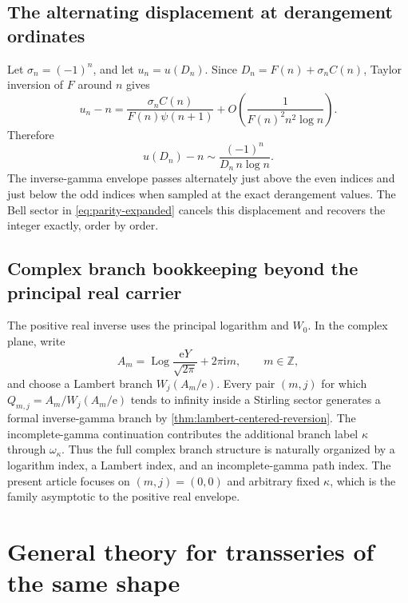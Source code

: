 \documentclass[11pt]{article}
\numberwithin{equation}{section}
\theoremstyle{mainthm}
\theoremstyle{defstyle}
\theoremstyle{remark}
\newcommand{\e}{\mathrm e}
\newcommand{\ii}{\mathrm i}
\newcommand{\Log}{\operatorname{Log}}
\begin{document}
\subsection{The alternating displacement at derangement ordinates}

Let \(\sigma_n=(-1)^n\), and let \(u_n=u(D_n)\).  Since
\(
 D_n=F(n)+\sigma_nC(n)
\), Taylor inversion of \(F\) around \(n\) gives
\begin{equation}\label{eq:u-n-exact-leading}
 u_n-n
 =\frac{\sigma_n C(n)}{F(n)\psi(n+1)}
 +O\!\left(\frac{1}{F(n)^2n^2\log n}\right).
\end{equation}
Therefore
\begin{equation}\label{eq:u-n-simple-asymptotic}
 \boxed{
 u(D_n)-n
 \sim\frac{(-1)^n}{D_n\,n\log n}.}
\end{equation}
The inverse-gamma envelope passes alternately just above the even indices and just below the odd indices when sampled at the exact derangement values.  The Bell sector in \cref{eq:parity-expanded} cancels this displacement and recovers the integer exactly, order by order.

\subsection{Complex branch bookkeeping beyond the principal real carrier}

The positive real inverse uses the principal logarithm and \(W_0\).  In the complex plane, write
\begin{equation}\label{eq:complex-A-m}
 A_m=\Log\frac{\e Y}{\sqrt{2\pi}}+2\pi\ii m,
 \qquad m\in\mathbb Z,
\end{equation}
and choose a Lambert branch \(W_j(A_m/\e)\).  Every pair \((m,j)\) for which
\(
 Q_{m,j}=A_m/W_j(A_m/\e)
\)
tends to infinity inside a Stirling sector generates a formal inverse-gamma branch by \cref{thm:lambert-centered-reversion}.  The incomplete-gamma continuation contributes the additional branch label \(\kappa\) through \(\omega_\kappa\).  Thus the full complex branch structure is naturally organized by a logarithm index, a Lambert index, and an incomplete-gamma path index.  The present article focuses on \((m,j)=(0,0)\) and arbitrary fixed \(\kappa\), which is the family asymptotic to the positive real envelope.

\section{General theory for transseries of the same shape}\label{sec:general-theory}
\end{document}
